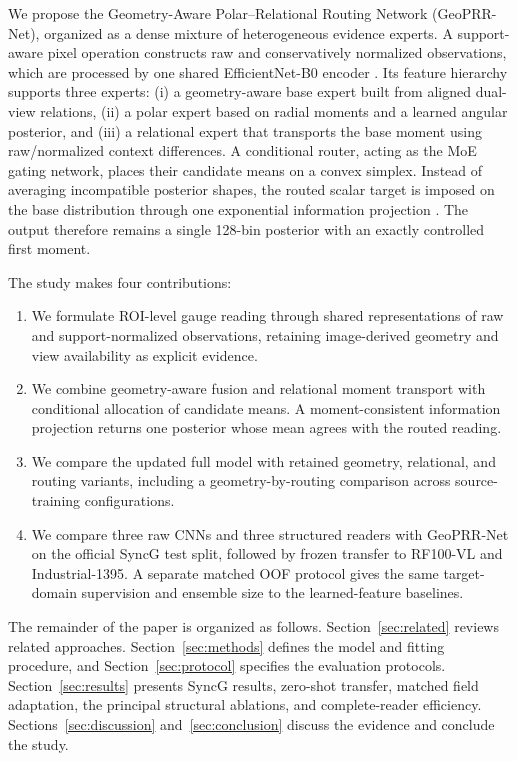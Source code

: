 \documentclass[electronics,article,submit,oneauthor]{Definitions/mdpi}
\newcommand{\modelname}{GeoPRR-Net\xspace}
\begin{document}
We propose the Geometry-Aware Polar--Relational Routing Network (\modelname), organized as a dense mixture of heterogeneous evidence experts. A support-aware pixel operation constructs raw and conservatively normalized observations, which are processed by one shared EfficientNet-B0 encoder \cite{tan2019efficientnet}. Its feature hierarchy supports three experts: (i) a geometry-aware base expert built from aligned dual-view relations, (ii) a polar expert based on radial moments and a learned angular posterior, and (iii) a relational expert that transports the base moment using raw/normalized context differences. A conditional router, acting as the MoE gating network, places their candidate means on a convex simplex. Instead of averaging incompatible posterior shapes, the routed scalar target is imposed on the base distribution through one exponential information projection \cite{csiszar1975idivergence}. The output therefore remains a single 128-bin posterior with an exactly controlled first moment.

The study makes four contributions:
\begin{enumerate}[leftmargin=*]
    \item We formulate ROI-level gauge reading through shared representations of raw and support-normalized observations, retaining image-derived geometry and view availability as explicit evidence.
    \item We combine geometry-aware fusion and relational moment transport with conditional allocation of candidate means. A moment-consistent information projection returns one posterior whose mean agrees with the routed reading.
    \item We compare the updated full model with retained geometry, relational, and routing variants, including a geometry-by-routing comparison across source-training configurations.
    \item We compare three raw CNNs and three structured readers with \modelname on the official SyncG test split, followed by frozen transfer to RF100-VL and Industrial-1395. A separate matched OOF protocol gives the same target-domain supervision and ensemble size to the learned-feature baselines.
\end{enumerate}

The remainder of the paper is organized as follows. Section~\ref{sec:related} reviews related approaches. Section~\ref{sec:methods} defines the model and fitting procedure, and Section~\ref{sec:protocol} specifies the evaluation protocols. Section~\ref{sec:results} presents SyncG results, zero-shot transfer, matched field adaptation, the principal structural ablations, and complete-reader efficiency. Sections~\ref{sec:discussion} and~\ref{sec:conclusion} discuss the evidence and conclude the study.
\end{document}
